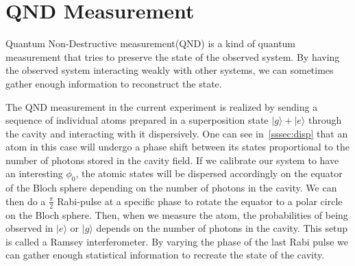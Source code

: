 \documentclass[10pt,a4paper]{report}
\theoremstyle{plain}
\theoremstyle{definition}
\theoremstyle{remark}
\newcommand{\ket}[1]{|#1\rangle}
\begin{document}









\section{QND Measurement}

Quantum Non-Destructive measurement(QND) is a kind of quantum measurement that tries
to preserve the state of the observed system. By having the observed system
interacting weakly with other systems, we can sometimes gather enough
information to reconstruct the state.

The QND measurement in the current experiment is realized by sending a sequence
of individual atoms prepared in a superposition state $\ket{g}+\ket{e}$ through
the
cavity and interacting with it dispersively. One can see in~\cref{sssec:disp} that
an atom in this case will undergo a phase shift between its states
proportional to the number of photons stored in the cavity field. If we
calibrate our system to have an interesting $\phi_0$, the atomic states will be
dispersed accordingly on the equator of the Bloch sphere depending on the number
of photons
in the cavity. We can then do a $\frac\pi2$ Rabi-pulse at a specific phase to
rotate the equator to a polar circle on the Bloch sphere. Then, when we measure the
atom, the probabilities of being observed in $\ket e$ or $\ket g$ depends on the
number of photons in the cavity. This setup is called a Ramsey interferometer.
By varying the phase of the last Rabi pulse we can gather enough statistical
information to recreate the state of the cavity.
\end{document}
